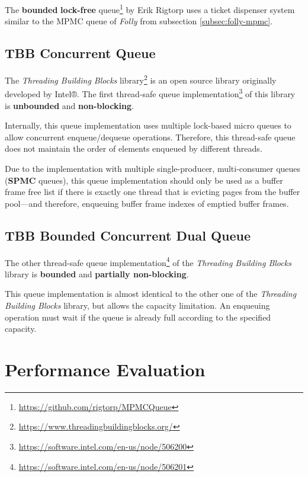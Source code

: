 	The \textbf{bounded} \textbf{lock-free} queue\footnote{\url{https://github.com/rigtorp/MPMCQueue}} by Erik Rigtorp uses a ticket dispenser system similar to the MPMC queue of \textit{Folly} from subsection \ref{subsec:folly-mpmc}.

\subsection[TBB Concurrent Queue]{TBB Concurrent Queue} \label{subsec:intel-unbounded}

	The \textit{Threading Building Blocks} library\footnote{\url{https://www.threadingbuildingblocks.org/}} is an open source library originally developed by Intel®. The first thread-safe queue implementation\footnote{\url{https://software.intel.com/en-us/node/506200}} of this library is \textbf{unbounded} and \textbf{non-blocking}.
	
	Internally, this queue implementation uses multiple lock-based micro queues to allow concurrent enqueue/dequeue operations. Therefore, this thread-safe queue does not maintain the order of elements enqueued by different threads.

    Due to the implementation with multiple single-producer, multi-consumer queues (\textbf{SPMC} queues), this queue implementation should only be used as a buffer frame free list if there is exactly one thread that is evicting pages from the buffer pool---and therefore, enqueuing buffer frame indexes of emptied buffer frames.

\subsection[TBB Bounded Concurrent Queue]{TBB Bounded Concurrent Dual Queue} \label{subsec:intel-bounded}

	The other thread-safe queue implementation\footnote{\url{https://software.intel.com/en-us/node/506201}} of the \textit{Threading Building Blocks} library is \textbf{bounded} and \textbf{partially non-blocking}.
	
	This queue implementation is almost identical to the other one of the \textit{Threading Building Blocks} library, but allows the capacity limitation. An enqueuing operation must wait if the queue is already full according to the specified capacity.

\section[Performance Evaluation]{Performance Evaluation} \label{sec:free-list-performance}

